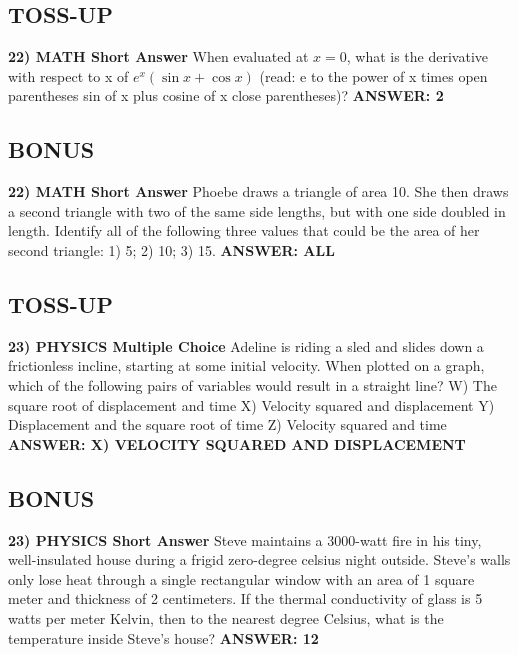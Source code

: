 \documentclass{article}
\begin{document}
\subsection*{TOSS-UP}
\textbf{22) MATH Short Answer} When evaluated at $x=0$, what is the derivative with respect to x of $e^{x}(\sin x + \cos x)$ (read: e to the power of x times open parentheses sin of x plus cosine of x close parentheses)?
\newline
\textbf{ANSWER: 2}

\subsection*{BONUS}
\textbf{22) MATH Short Answer} Phoebe draws a triangle of area 10. She then draws a second triangle with two of the same side lengths, but with one side doubled in length. Identify all of the following three values that could be the area of her second triangle: 1) 5; 2) 10; 3) 15.
\newline
\textbf{ANSWER: ALL}

\subsection*{TOSS-UP}
\textbf{23) PHYSICS Multiple Choice} Adeline is riding a sled and slides down a frictionless incline, starting at some initial velocity. When plotted on a graph, which of the following pairs of variables would result in a straight line?
\newline
W) The square root of displacement and time
\newline
X) Velocity squared and displacement
\newline
Y) Displacement and the square root of time
\newline
Z) Velocity squared and time
\newline
\textbf{ANSWER: X) VELOCITY SQUARED AND DISPLACEMENT}

\subsection*{BONUS}
\textbf{23) PHYSICS Short Answer} Steve maintains a 3000-watt fire in his tiny, well-insulated house during a frigid zero-degree celsius night outside. Steve's walls only lose heat through a single rectangular window with an area of 1 square meter and thickness of 2 centimeters. If the thermal conductivity of glass is 5 watts per meter Kelvin, then to the nearest degree Celsius, what is the temperature inside Steve's house?
\newline
\textbf{ANSWER: 12}
\end{document}
